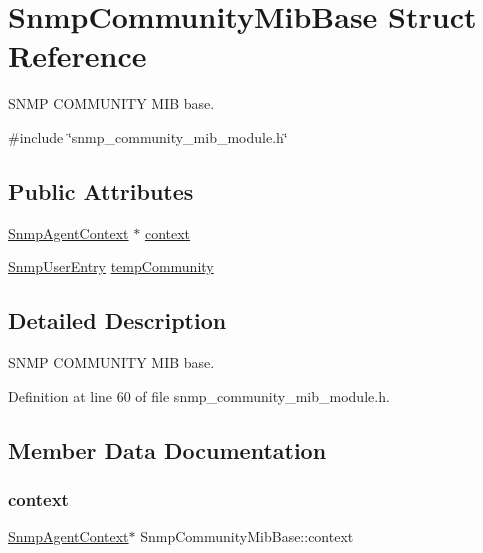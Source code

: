 \hypertarget{structSnmpCommunityMibBase}{}\section{Snmp\+Community\+Mib\+Base Struct Reference}
\label{structSnmpCommunityMibBase}


S\+N\+MP C\+O\+M\+M\+U\+N\+I\+TY M\+IB base.  




{\ttfamily \#include \char`\"{}snmp\+\_\+community\+\_\+mib\+\_\+module.\+h\char`\"{}}

\subsection*{Public Attributes}
\begin{DoxyCompactItemize}
\item 
\hyperlink{snmp__agent_8h_a4c68afef83114acf80065b64191bfdac}{Snmp\+Agent\+Context} $\ast$ \hyperlink{structSnmpCommunityMibBase_a0edf57727272a9be6f920afcecbfa86d}{context}
\item 
\hyperlink{structSnmpUserEntry}{Snmp\+User\+Entry} \hyperlink{structSnmpCommunityMibBase_a1dc8d7fc590d78767ba81645320cb1e8}{temp\+Community}
\end{DoxyCompactItemize}


\subsection{Detailed Description}
S\+N\+MP C\+O\+M\+M\+U\+N\+I\+TY M\+IB base. 

Definition at line 60 of file snmp\+\_\+community\+\_\+mib\+\_\+module.\+h.



\subsection{Member Data Documentation}
\mbox{\label{structSnmpCommunityMibBase_a0edf57727272a9be6f920afcecbfa86d}} 
\subsubsection{\texorpdfstring{context}{context}}
{\footnotesize\ttfamily \hyperlink{snmp__agent_8h_a4c68afef83114acf80065b64191bfdac}{Snmp\+Agent\+Context}$\ast$ Snmp\+Community\+Mib\+Base\+::context}



